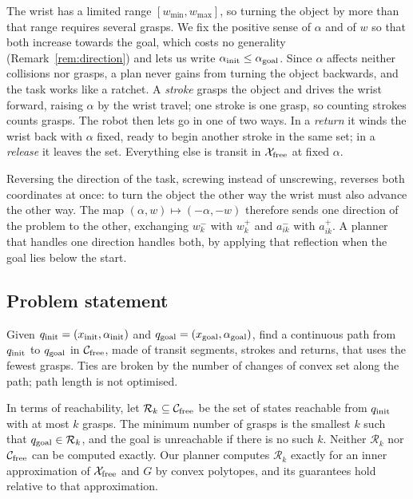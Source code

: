 The wrist has a limited range $[w_{\min},w_{\max}]$, so turning the object by
more than that range requires several grasps. We fix the positive sense of
$\alpha$ and of $w$ so that both increase towards the goal, which costs no
generality (Remark~\ref{rem:direction}) and lets us write $\alpha_{\mathrm{init}}\le\alpha_{\mathrm{goal}}$.
Since $\alpha$ affects neither collisions nor grasps, a plan never gains from
turning the object backwards, and the task works like a ratchet. A
\emph{stroke} grasps the object and drives the wrist forward, raising $\alpha$
by the wrist travel; one stroke is one grasp, so counting strokes counts
grasps. The robot then lets go in one of two ways. In a \emph{return} it winds
the wrist back with $\alpha$ fixed, ready to begin another stroke in the same
set; in a \emph{release} it leaves the set. Everything else is transit in
$\mathcal{X}_{\mathrm{free}}$ at fixed $\alpha$.

\begin{remark}
\label{rem:direction}
Reversing the direction of the task, screwing instead of unscrewing, reverses
both coordinates at once: to turn the object the other way the wrist must also
advance the other way. The map $(\alpha,w)\mapsto(-\alpha,-w)$ therefore sends
one direction of the problem to the other, exchanging $w^-_k$ with $w^+_k$ and
$a^-_{ik}$ with $a^+_{ik}$. A planner that handles one direction handles both,
by applying that reflection when the goal lies below the start.
\end{remark}

\subsection{Problem statement}
\label{sec:problem:statement}
Given $q_{\mathrm{init}}=(x_{\mathrm{init}},\alpha_{\mathrm{init}})$ and $q_{\mathrm{goal}}=(x_{\mathrm{goal}},\alpha_{\mathrm{goal}})$, find a continuous
path from $q_{\mathrm{init}}$ to $q_{\mathrm{goal}}$ in $\mathcal{C}_{\mathrm{free}}$, made of transit segments,
strokes and returns, that uses the fewest grasps. Ties are broken by the
number of changes of convex set along the path; path length is not
optimised.

In terms of reachability, let $\mathcal{R}_k\subseteq\mathcal{C}_{\mathrm{free}}$ be the set of
states reachable from $q_{\mathrm{init}}$ with at most $k$ grasps. The minimum number of
grasps is the smallest $k$ such that $q_{\mathrm{goal}}\in\mathcal{R}_k$, and the goal
is unreachable if there is no such $k$. Neither $\mathcal{R}_k$ nor $\mathcal{C}_{\mathrm{free}}$
can be computed exactly. Our planner computes $\mathcal{R}_k$ exactly for an
inner approximation of $\mathcal{X}_{\mathrm{free}}$ and $G$ by convex polytopes, and its
guarantees hold relative to that approximation.
